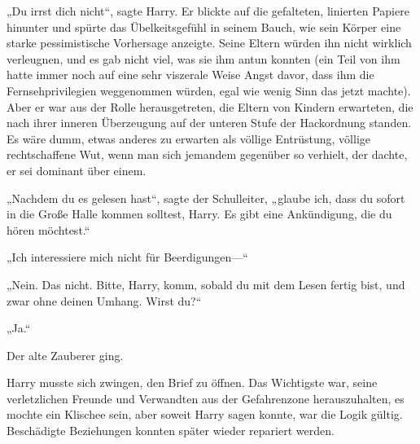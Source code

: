 „Du irrst dich nicht“, sagte Harry.
Er blickte auf die gefalteten, linierten Papiere hinunter und spürte das Übelkeitsgefühl in seinem Bauch, wie sein Körper eine starke pessimistische Vorhersage anzeigte. Seine Eltern würden ihn nicht wirklich verleugnen, und es gab nicht viel, was sie ihm antun konnten (ein Teil von ihm hatte immer noch auf eine sehr viszerale Weise Angst davor, dass ihm die Fernsehprivilegien weggenommen würden, egal wie wenig Sinn das jetzt machte). Aber er war aus der Rolle herausgetreten, die Eltern von Kindern erwarteten, die nach ihrer inneren Überzeugung auf der unteren Stufe der Hackordnung standen. Es wäre dumm, etwas anderes zu erwarten als völlige Entrüstung, völlige rechtschaffene Wut, wenn man sich jemandem gegenüber so verhielt, der dachte, er sei dominant über einem.

„Nachdem du es gelesen hast“, sagte der Schulleiter, „glaube ich, dass du sofort in die Große Halle kommen solltest, Harry. Es gibt eine Ankündigung, die du hören möchtest.“

„Ich interessiere mich nicht für Beerdigungen—“

„Nein. Das nicht. Bitte, Harry, komm, sobald du mit dem Lesen fertig bist, und zwar ohne deinen Umhang. Wirst du?“

„Ja.“

Der alte Zauberer ging.

Harry musste sich zwingen, den Brief zu öffnen. Das Wichtigste war, seine verletzlichen Freunde und Verwandten aus der Gefahrenzone herauszuhalten, es mochte ein Klischee sein, aber soweit Harry sagen konnte, war die Logik gültig. Beschädigte Beziehungen konnten später wieder repariert werden.

